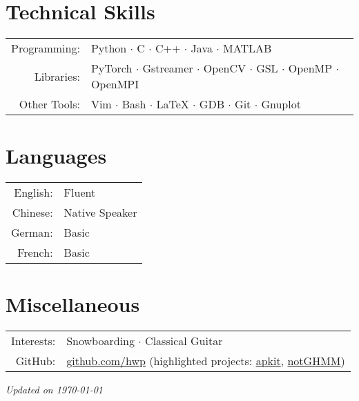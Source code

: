 \documentclass[a4paper,10pt]{article} %
\begin{document}

\section{Technical Skills}

\begin{tabular}{rl}
  Programming: & Python $\cdotp$ C $\cdotp$ C++ $\cdotp$ Java $\cdotp$ MATLAB \\
  Libraries: & PyTorch $\cdotp$ Gstreamer $\cdotp$ OpenCV $\cdotp$ GSL $\cdotp$ OpenMP $\cdotp$ OpenMPI \\
  Other Tools: & Vim $\cdotp$ Bash $\cdotp$ \LaTeX{} $\cdotp$ GDB $\cdotp$ Git $\cdotp$ Gnuplot \\
\end{tabular}


\section{Languages}

\begin{tabular}{rl}
  English: & Fluent \\
  Chinese: & Native Speaker \\
  German: & Basic \\
  French: & Basic \\
\end{tabular}

\section{Miscellaneous}

\begin{tabular}{rl}
  Interests: & Snowboarding $\cdotp$ Classical Guitar \\
  GitHub: & \href{https://github.com/hwp}{github.com/hwp} (highlighted projects: \href{https://github.com/hwp/apkit}{apkit}, \href{https://github.com/hwp/notGHMM}{notGHMM}) \\
\end{tabular}



\vfill
\centering \footnotesize \itshape Updated on \today
\end{document}
